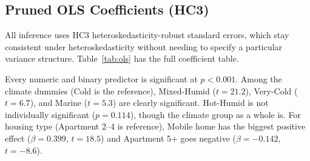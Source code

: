 \documentclass[10pt,twocolumn]{article}
\begin{document}
\subsection{Pruned OLS Coefficients (HC3)}

All inference uses HC3 heteroskedasticity-robust standard errors, which stay consistent under heteroskedasticity without needing to specify a particular variance structure. Table~\ref{tab:ols} has the full coefficient table.

Every numeric and binary predictor is significant at $p < 0.001$. Among the climate dummies (Cold is the reference), Mixed-Humid ($t = 21.2$), Very-Cold ($t = 6.7$), and Marine ($t = 5.3$) are clearly significant. Hot-Humid is not individually significant ($p = 0.114$), though the climate group as a whole is. For housing type (Apartment 2--4 is reference), Mobile home has the biggest positive effect ($\beta = 0.399$, $t = 18.5$) and Apartment 5+ goes negative ($\beta = -0.142$, $t = -8.6$).
\end{document}
